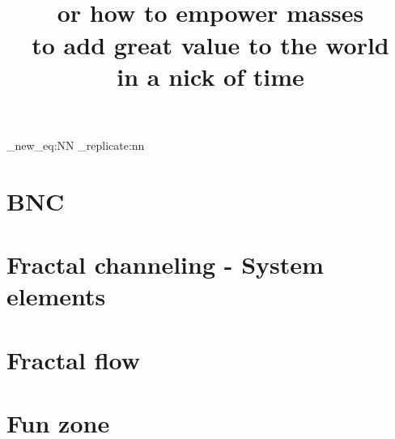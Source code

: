 

\title{\\  \huge or how to empower masses\\to add great value to the world\\in a nick of time}


\maketitle
\newpage
\tableofcontents  
\newpage
\listoftables
\newpage
\listoffigures

\setcounter{secnumdepth}{4}


\ExplSyntaxOn
\cs_new_eq:NN \Repeat \prg_replicate:nn
\ExplSyntaxOff


\newpage
\part{BNC}

\part{Fractal channeling - System elements}

\part{Fractal flow} 

\part{Fun zone}



% 


\newpage


